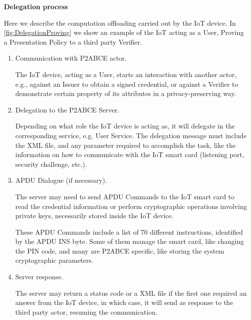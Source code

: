 \documentclass[journal]{IEEEtran}
\begin{document}
\hfil

\begin{flushleft}
	\textbf{Delegation process}
\end{flushleft}

Here we describe the computation offloading carried out by the IoT device.  In \autoref{fig:DelegationProving} we show an example of the IoT acting as a User, Proving a Presentation Policy to a third party Verifier.

\begin{enumerate}
	\item Communication with P2ABCE actor.
	
	The IoT device, acting as a User, starts an interaction with another actor, e.g., against an Issuer to obtain a signed credential, or against a Verifier to demonstrate certain property of its attributes in a privacy-preserving way.
	
	\item Delegation to the P2ABCE Server.
	
	Depending on what role the IoT device is acting as, it will delegate in the corresponding service, e.g. User Service. The delegation message must include the XML file, and any parameter required to accomplish the task, like the information on how to communicate with the IoT smart card (listening port, security challenge, etc.).
	
	\item APDU Dialogue (if necessary).
	
	The server may need to send APDU Commands to the IoT smart card to read the credential information or perform cryptographic operations involving private keys, necessarily stored inside the IoT device.
	
	These APDU Commands include a list of 70 different instructions, identified by the APDU INS byte. Some of them manage the smart card, like changing the PIN code, and many are P2ABCE specific, like storing the system cryptographic parameters.
	
	\hfil
	
	\item Server response.
	
	The server may return a status code or a XML file if the first one required an answer from the IoT device, in which case, it will send as response to the third party actor, resuming the communication.
	
\end{enumerate}
\end{document}
